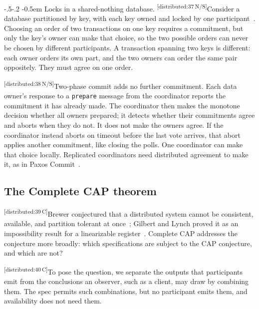 \documentclass[sigconf]{cidr-2027}
\makeatletter
\theoremstyle{remark}
\renewcommand\paragraph{\@startsection{paragraph}{4}{\z@}%
  {-.5\baselineskip \@plus -2\p@ \@minus -.2\p@}%
  {-0.5em}%
  {\normalfont\bfseries}}
\newcommand{\commitment}{commitment\xspace}
\newcommand{\commitments}{commitments\xspace}
\newcommand{\cxtag}[2]{\textsuperscript{\textsf{\tiny[#1\,#2]}}}
\makeatother
\begin{document}
\paragraph{Locks in a shared-nothing database.}
\color{black}\cxtag{distributed:37}{N/S}Consider a database partitioned by key, with each key owned and locked by one
participant~\cite{stonebraker1986sharednothing}.  Choosing an order of two
transactions on one key requires a \commitment, but only the key's owner can
make that choice, so the two possible orders can never be chosen by different
participants.  A transaction spanning two keys is different: each owner orders
its own part, and the two owners can order the same pair oppositely.  They must
agree on one order.\color{black}

\color{black}\cxtag{distributed:38}{N/S}Two-phase commit adds no further \commitment.  Each data owner's response to a \texttt{prepare} message
from the coordinator reports the
\commitment it has already made.  The coordinator then makes the monotone
decision whether all owners prepared; it detects whether their \commitments
agree and aborts when they do not.  It does not make the owners agree.  If the
coordinator instead aborts on timeout before the last vote arrives, that abort
applies another \commitment, like closing the polls.  One coordinator can make
that choice locally.  Replicated coordinators need distributed agreement to
make it, as in Paxos Commit~\cite{gray2006consensus}.\color{black}

\subsection{The Complete CAP theorem}
\label{sec:complete-cap}

\color{black!45}\cxtag{distributed:39}{C}Brewer conjectured that a distributed system cannot be consistent, available,
and partition tolerant at once~\cite{brewer2000towards}; Gilbert and Lynch
proved it as an impossibility result for a linearizable register~\cite{gilbert2002cap}.
Complete CAP addresses the conjecture more broadly:
which specifications are subject to the CAP
conjecture, and which are not?\color{black}

\color{black!45}\cxtag{distributed:40}{C}To pose the question, we separate the outputs that participants emit from
the conclusions an observer, such as a client, may draw by combining them.  The spec permits such combinations, but no participant emits them, and
availability does not need them.\color{black}
\end{document}
